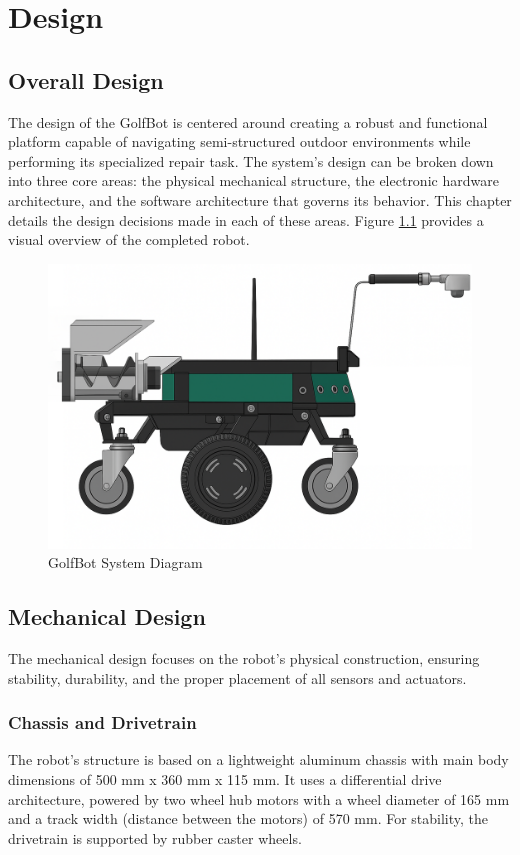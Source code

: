 \chapter{Design}
\label{chap:design}

\section{Overall Design}
\label{sec:overall_design}
The design of the GolfBot is centered around creating a robust and functional platform capable of navigating semi-structured outdoor environments while performing its specialized repair task. The system's design can be broken down into three core areas: the physical mechanical structure, the electronic hardware architecture, and the software architecture that governs its behavior. This chapter details the design decisions made in each of these areas. Figure \ref{fig:golfbot_system_diagram} provides a visual overview of the completed robot.

\begin{figure}[h!]
    \centering
    \includegraphics[width=0.7\linewidth]{figures/complete.png}
    \caption{GolfBot System Diagram}
    \label{fig:golfbot_system_diagram}
\end{figure}

\section{Mechanical Design}
\label{sec:mechanical_design}
The mechanical design focuses on the robot's physical construction, ensuring stability, durability, and the proper placement of all sensors and actuators.

\subsection{Chassis and Drivetrain}
\label{ssec:chassis_drivetrain}
The robot's structure is based on a lightweight aluminum chassis with main body dimensions of 500 mm x 360 mm x 115 mm. It uses a differential drive architecture, powered by two wheel hub motors with a wheel diameter of 165 mm and a track width (distance between the motors) of 570 mm. For stability, the drivetrain is supported by rubber caster wheels.

